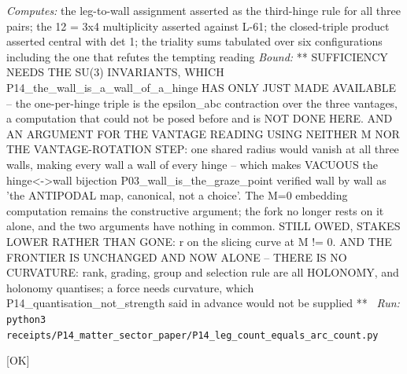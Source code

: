 \begin{description}
\emph{Computes:} the leg-to-wall assignment asserted as the third-hinge rule for all three pairs; the 12 = 3x4 multiplicity asserted against L-61; the closed-triple product asserted central with det 1; the triality sums tabulated over six configurations including the one that refutes the tempting reading
 \emph{Bound:} ** SUFFICIENCY NEEDS THE SU(3) INVARIANTS, WHICH P14\_the\_wall\_is\_a\_wall\_of\_a\_hinge HAS ONLY JUST MADE AVAILABLE -- the one-per-hinge triple is the epsilon\_abc contraction over the three vantages, a computation that could not be posed before and is NOT DONE HERE. AND AN ARGUMENT FOR THE VANTAGE READING USING NEITHER M NOR THE VANTAGE-ROTATION STEP: one shared radius would vanish at all three walls, making every wall a wall of every hinge -- which makes VACUOUS the hinge<->wall bijection P03\_wall\_is\_the\_graze\_point verified wall by wall as 'the ANTIPODAL map, canonical, not a choice'. The M=0 embedding computation remains the constructive argument; the fork no longer rests on it alone, and the two arguments have nothing in common. STILL OWED, STAKES LOWER RATHER THAN GONE: r on the slicing curve at M != 0. AND THE FRONTIER IS UNCHANGED AND NOW ALONE -- THERE IS NO CURVATURE: rank, grading, group and selection rule are all HOLONOMY, and holonomy quantises; a force needs curvature, which P14\_quantisation\_not\_strength said in advance would not be supplied **
\ \emph{Run:} \texttt{python3 receipts/P14\_matter\_sector\_paper/P14\_leg\_count\_equals\_arc\_count.py}
\item[\rcptlabel{P14_the_gap_is_antisymmetry}{P14R30}\textbf{P14R30}\quad\texttt{P14\_the\_gap\_is\_antisymmetry}]\hfill\textsf{[OK]}\\

\end{description}
